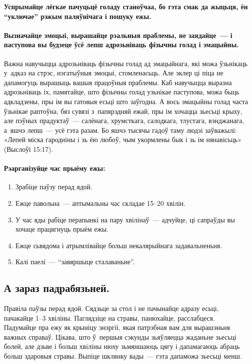 \textbf{Успрымайце лёгкае пачуцьцё голаду станоўчаа, бо гэта смак да жыцьця, ён ``уключае'' рэжым паляўнічага і пошуку ежы.}

\paragraph{Вызначайце эмоцыі, вырашайце рэальныя праблемы, не заядайце~--- і паступова вы будзеце ўсё лепш адрозьніваць фізычны голад і эмацыйны.} Важна навучыцца адрозьніваць фізычны голад ад эмацыйнага, які можа ўзьнікаць у~адказ на стрэс, нэгатыўныя эмоцыі, стомленасьць. Але эклер ці піца не дапамогуць вырашыць вашыя працоўныя праблемы. Каб навучыцца выразна адрозьніваць іх, памятайце, што фізычны голад узьнікае паступова, можа быць адкладзены, пры ім вы гатовыя есьці што заўгодна. А вось эмацыйны голад часта ўзьнікае раптоўна, бяз сувязі з~папярэдняй ежай, пры ім хочацца зьесьці крыху, але пэўных прадуктаў~--- салёнага, хрумсткага, салодкага, тлустага, вэнджанага, а~яшчэ лепш~--- усё гэта разам. Бо яшчэ тысячы гадоў таму людзі заўважылі: «Лепей міска гародніны і зь ёю любоў, чым укормлены бык і зь ім нянавісьць» (Выслоўі 15:17).

\paragraph{Рэарганізуйце час прыёму ежы:}
\begin{enumerate}
  \item Зрабіце паўзу перад ядой.
  \item Ежце павольна~--- аптымальны час складае 15--20 хвілін.
  \item У час яды рабіце перапынкі на пару хвілінаў~--- адчуйце, ці сапраўды вы хочаце працягнуць прыём ежы.
  \item Ежце сьвядома і атрымлівайце больш некалярыйнага задавальненьня.
  \item Калі паелі~--- ``завяршыце сталаваньне''.
\end{enumerate}

\subsection*{А зараз падрабязьней.}
Правіла паўзы перад ядой. Сядзьце за стол і не пачынайце адразу есьці, пачакайце 1--3 хвіліны. Паглядзіце на стравы, панюхайце, расслабцеся. Падумайце пра ежу як крыніцу энэргіі, якая патрэбная вам для вырашэньня важных справаў. Цікава, што ў~першыя сэкунды зьяўляецца жаданьне зьесьці болей, але дзьве і больш хвіліны нюху зьмяншаюць цягу і дапамагаюць абраць больш здаровыя стравы. Выпіце шклянку вады~--- гэта дапаможа зьесьці менш. 

